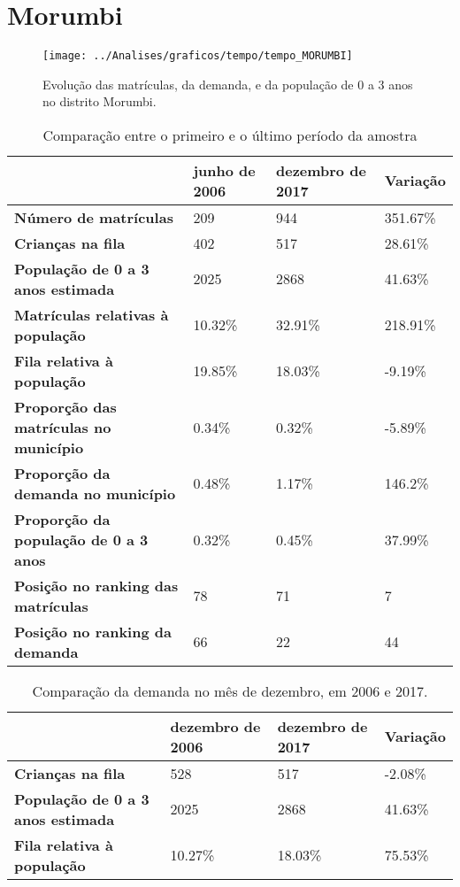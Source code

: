 \section{Morumbi}
\begin{figure}[H]
\centering
\texttt{[image: ../Analises/graficos/tempo/tempo\_MORUMBI]}
\caption{Evolução das matrículas, da demanda, e da população de 0 a 3 anos no distrito Morumbi.}
\end{figure}
\begin{table}[H]
\begin{tabular}{|l|l|l|l|}
\hline
\textbf{}                                      & \textbf{junho de 2006}       & \textbf{dezembro de 2017}    & \textbf{Variação} \\ \hline
\textbf{Número de matrículas}                  & 209 & 944 & 351.67\% \\ \hline
\textbf{Crianças na fila}                      & 402 & 517 & 28.61\% \\ \hline
\textbf{População de 0 a 3 anos estimada}      & 2025 & 2868 & 41.63\% \\ \hline
\textbf{Matrículas relativas à população}      & 10.32\% & 32.91\% & 218.91\% \\ \hline
\textbf{Fila relativa à população}             & 19.85\% & 18.03\% & -9.19\% \\ \hline
\textbf{Proporção das matrículas no município} & 0.34\% & 0.32\% & -5.89\% \\ \hline
\textbf{Proporção da demanda no município}     & 0.48\% & 1.17\% & 146.2\% \\ \hline
\textbf{Proporção da população de 0 a 3 anos}  & 0.32\% & 0.45\% & 37.99\% \\ \hline
\textbf{Posição no ranking das matrículas}     & 78 & 71 & 7 \\ \hline
\textbf{Posição no ranking da demanda}         & 66 & 22 & 44 \\ \hline
\end{tabular}
\caption{Comparação entre o primeiro e o último período da amostra}
\end{table}
\begin{table}[H]
\begin{tabular}{|l|l|l|l|}
\hline
\textbf{}                                 & \textbf{dezembro de 2006} & \textbf{dezembro de 2017} & \textbf{Variação} \\ \hline
\textbf{Crianças na fila}                      & 528 & 517 & -2.08\% \\ \hline
\textbf{População de 0 a 3 anos estimada}      & 2025 & 2868 & 41.63\% \\ \hline
\textbf{Fila relativa à população}             & 10.27\% & 18.03\% & 75.53\% \\ \hline
\end{tabular}
\caption{Comparação da demanda no mês de dezembro, em 2006 e 2017.}
\end{table}
